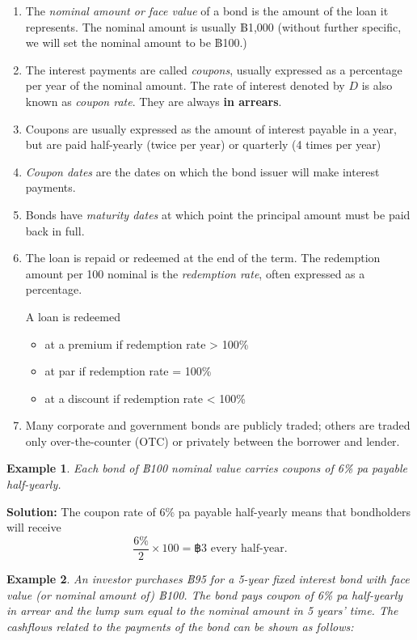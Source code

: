 \documentclass[
]{book}
\theoremstyle{definition}
\theoremstyle{definition}
\newtheorem{example}{Example}[chapter]
\theoremstyle{definition}
\theoremstyle{definition}
\theoremstyle{remark}
\begin{document}
\begin{enumerate}
\def\labelenumi{\arabic{enumi}.}
\item
  The \emph{nominal amount or face value} of a bond is the amount of the
  loan it represents. The nominal amount is usually ฿1,000 (without
  further specific, we will set the nominal amount to be ฿100.)
\item
  The interest payments are called \emph{coupons}, usually expressed as a
  percentage per year of the nominal amount. The rate of interest
  denoted by \(D\) is also known as \emph{coupon rate}. They are always \textbf{in
  arrears}.
\item
  Coupons are usually expressed as the amount of interest payable in a
  year, but are paid half-yearly (twice per year) or quarterly (4
  times per year)
\item
  \emph{Coupon dates} are the dates on which the bond issuer will make
  interest payments.
\item
  Bonds have \emph{maturity dates} at which point the principal amount must
  be paid back in full.
\item
  The loan is repaid or redeemed at the end of the term. The
  redemption amount per 100 nominal is the \emph{redemption rate}, often
  expressed as a percentage.

  A loan is redeemed

  \begin{itemize}
  \item
    at a premium if redemption rate \textgreater{} 100\%
  \item
    at par if redemption rate = 100\%
  \item
    at a discount if redemption rate \textless{} 100\%
  \end{itemize}
\item
  Many corporate and government bonds are publicly traded; others are
  traded only over-the-counter (OTC) or privately between the borrower
  and lender.
\end{enumerate}

\begin{example}
\emph{Each bond of ฿100 nominal value carries coupons of 6\% pa payable
half-yearly.}
\end{example}

\textbf{Solution:} The coupon rate of 6\% pa payable half-yearly means that
bondholders will receive
\[ \frac{6\%}{2} \times 100 = ฿ 3 \text{ every half-year}.\]

\begin{example}
\emph{An investor purchases ฿95 for a 5-year fixed interest bond with face
value (or nominal amount of) ฿100. The bond pays coupon of 6\% pa
half-yearly in arrear and the lump sum equal to the nominal amount in 5
years' time. The cashflows related to the payments of the bond can be
shown as follows:}
\end{example}
\end{document}
